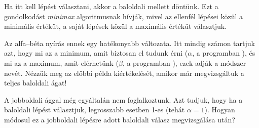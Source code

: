 \begin{center}
\end{center}

Ha itt kell lépést választani, akkor a baloldali
mellett döntünk. Ezt a gondolkodást \emph{minimax}
algoritmusnak hívják, mivel az ellenfél lépései
közül a minimális értékűt, a saját lépések közül a
maximális értékűt választjuk.

Az alfa--béta nyírás ennek egy hatékonyabb
változata. Itt mindig számon tartjuk azt, hogy mi az
a minimum, amit biztosan el tudunk érni ($\alpha$, a
programban ), és mi az a maximum, amit
elérhetünk ($\beta$, a programban ), ezek
adják a módszer nevét. Nézzük meg az előbbi példa
kiértékelését, amikor már megvizsgáltuk a teljes
baloldali ágat!

\begin{center}
\end{center}

A jobboldali ággal még egyáltalán nem
foglalkoztunk. Azt tudjuk, hogy ha a baloldali
lépést választjuk, legrosszabb esetben 1-es (tehát
$\alpha=1$). Hogyan módosul ez a jobboldali lépésre
adott baloldali válasz megvizsgálása után?

